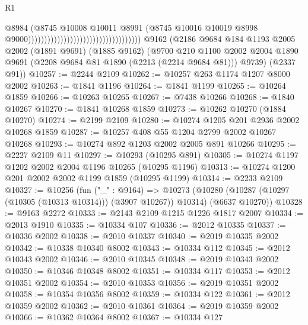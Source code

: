 \begin{lexlean}{R1}
\begin{coremodule}
                                                                      @8984
                                                                      (@8745
                                                                        @10008
                                                                        @10011
                                                                        @8991
                                                                        (@8745
                                                                          @10016
                                                                          @10019
                                                                          @8998
                                                                          @9000)))))))))))))))))))))))))))))))))))
    @9162
    (@2186
      @9684
      @184
      @1193
      @2005
      @2002
      (@1891 @9691)
      (@1885 @9162)
      (@9700
        @210
        @1100
        @2002
        @2004
        @1890
        @9691
        (@2208 @9684 @81 @1890 (@2213 (@2214 @9684 @81)))
        @9739)
      (@2337 @91))
@10257 := @2244 @2109
@10262 := @10257 @263 @1174 @1207 @8000 @2002
@10263 := @1841 @1196
@10264 := @1841 @1199
@10265 := @10264 @1859
@10266 := @10263 @10265
@10267 := @7438 @10266
@10268 := @1840 @10267
@10270 := @1841 @10268 @1859
@10273 := @10262 @10270 (@1884 @10270)
@10274 := @2199 @2109
@10280 := @10274 @1205 @201 @2936 @2002 @10268 @1859
@10287 := @10257 @408 @55 @1204 @2799 @2002 @10267 @10268
@10293 := @10274 @892 @1203 @2002 @2005 @891 @10266
@10295 := @2227 @2109 @11
@10297 := @10293 (@10295 @891)
@10305 := @10274 @1197 @1202 @2002 @2004 @1196 @10265 (@10295 @1196)
@10313 := @10274 @1200 @201 @2002 @2002 @1199 @1859 (@10295 @1199)
@10314 := @2233 @2109
@10327 := @10256
    (fun ("_" : @9164) =>
    @10273 (@10280 (@10287 (@10297 (@10305 (@10313 @10314))) (@3907 @10267)) @10314) (@6637 @10270))
@10328 := @9163 @2272
@10333 := @2143 @2109 @1215 @1226 @1817 @2007
@10334 := @2013 @1910
@10335 := @10334 @107
@10336 := @2012 @10335
@10337 := @10336 @2002
@10338 := @2010 @10337
@10340 := @2019 @10335 @2002
@10342 := @10338 @10340 @8002
@10343 := @10334 @112
@10345 := @2012 @10343 @2002
@10346 := @2010 @10345
@10348 := @2019 @10343 @2002
@10350 := @10346 @10348 @8002
@10351 := @10334 @117
@10353 := @2012 @10351 @2002
@10354 := @2010 @10353
@10356 := @2019 @10351 @2002
@10358 := @10354 @10356 @8002
@10359 := @10334 @122
@10361 := @2012 @10359 @2002
@10362 := @2010 @10361
@10364 := @2019 @10359 @2002
@10366 := @10362 @10364 @8002
@10367 := @10334 @127

\end{coremodule}
\end{lexlean}
